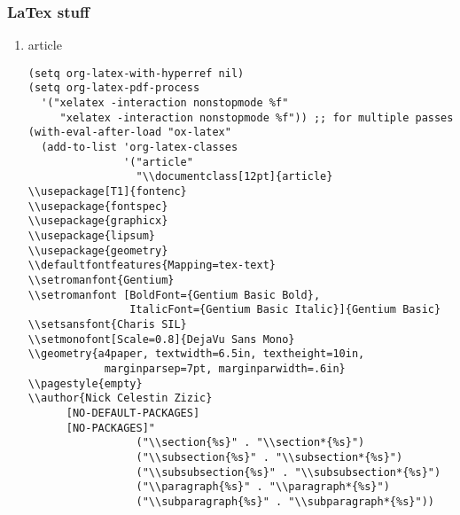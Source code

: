 \documentclass[11pt]{article}
\begin{document}
\subsubsection{LaTex stuff}
\label{sec:orgd66e988}
\begin{enumerate}
\item article
\label{sec:org1ae15f8}
\begin{verbatim}
(setq org-latex-with-hyperref nil)
(setq org-latex-pdf-process 
  '("xelatex -interaction nonstopmode %f"
     "xelatex -interaction nonstopmode %f")) ;; for multiple passes
(with-eval-after-load "ox-latex"
  (add-to-list 'org-latex-classes
               '("article"
                 "\\documentclass[12pt]{article}
\\usepackage[T1]{fontenc}
\\usepackage{fontspec}
\\usepackage{graphicx}
\\usepackage{lipsum}
\\usepackage{geometry}
\\defaultfontfeatures{Mapping=tex-text}
\\setromanfont{Gentium}
\\setromanfont [BoldFont={Gentium Basic Bold},
                ItalicFont={Gentium Basic Italic}]{Gentium Basic}
\\setsansfont{Charis SIL}
\\setmonofont[Scale=0.8]{DejaVu Sans Mono}
\\geometry{a4paper, textwidth=6.5in, textheight=10in,
            marginparsep=7pt, marginparwidth=.6in}
\\pagestyle{empty}
\\author{Nick Celestin Zizic}
      [NO-DEFAULT-PACKAGES]
      [NO-PACKAGES]"
                 ("\\section{%s}" . "\\section*{%s}")
                 ("\\subsection{%s}" . "\\subsection*{%s}")
                 ("\\subsubsection{%s}" . "\\subsubsection*{%s}")
                 ("\\paragraph{%s}" . "\\paragraph*{%s}")
                 ("\\subparagraph{%s}" . "\\subparagraph*{%s}"))


\end{verbatim}
\end{enumerate}
\end{document}
